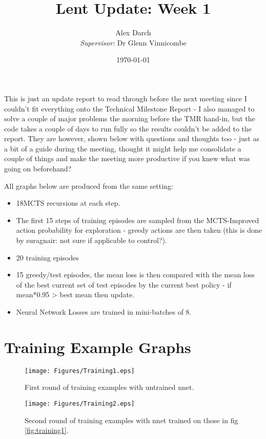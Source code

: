 \documentclass[11.7pt]{article}
\author{Alex Darch \\
   \textit{Supervisor:} Dr Glenn Vinnicombe}
\title{Lent Update: Week 1}
\date{\today}
\begin{document}
%

\maketitle

This is just an update report to read through before the next meeting since I couldn't fit everything onto the Technical Milestone Report - I also managed to solve a couple of major problems the morning before the TMR hand-in, but the code takes a couple of days to run fully so the results couldn't be added to the report. They are however, shown below with questions and thoughts too - just as a bit of a guide during the meeting, thought it might help me consolidate a couple of things and make the meeting more productive if you knew what was going on beforehand?
\vspace{0.7cm}

All graphs below are produced from the same setting:
\begin{itemize}
   \item 18MCTS recursions at each step. 
   \item The first 15 steps of training episodes are sampled from the MCTS-Improved action probability for exploration - greedy actions are then taken (this is done by suragnair: not sure if applicable to control?). 
   \item 20 training episodes
   \item 15 greedy/test episodes, the mean loss is then compared with the mean loss of the best current set of test episodes by the current best policy - if mean*0.95 > best mean then update.
   \item Neural Network Losses are trained in mini-batches of 8. 
\end{itemize}

\section{Training Example Graphs}

\begin{figure}[ht]
   \begin{minipage}[b]{0.48\linewidth}
      \centering
      \texttt{[image: Figures/Training1.eps]}
      \caption{First round of training examples with untrained nnet.}
      \label{fig:training1}
   \end{minipage}
   \hspace{0.2cm}
   \begin{minipage}[b]{0.48\linewidth}
      \centering
      \texttt{[image: Figures/Training2.eps]}
      \caption{Second round of training examples with nnet trained on those in fig \ref{fig:training1}.}
      \label{fig:training2}
   \end{minipage}
\end{figure}
\end{document}
